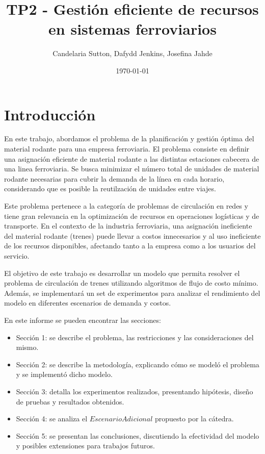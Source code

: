 \documentclass{article}
\title{TP2 - Gestión eficiente de recursos en sistemas ferroviarios}
\author{Candelaria Sutton, Dafydd Jenkins, Josefina Jahde}
\date{\today}
\begin{document}
\maketitle

\section*{Introducción}
En este trabajo, abordamos el problema de la planificación y gestión óptima del material rodante para una empresa ferroviaria. El problema consiste en definir una asignación eficiente de material rodante a las distintas estaciones cabecera de una linea ferroviaria. Se busca minimizar el número total de unidades de material rodante necesarias para cubrir la demanda de la línea en cada horario, considerando que es posible la reutilzación de unidades entre viajes.

Este problema pertenece a la categoría de problemas de circulación en redes y tiene gran relevancia en la optimización de recursos en operaciones logísticas y de transporte. En el contexto de la industria ferroviaria, una asignación ineficiente del material rodante (trenes) puede llevar a costos innecesarios y al uso ineficiente de los recursos disponibles, afectando tanto a la empresa como a los usuarios del servicio.

El objetivo de este trabajo es desarrollar un modelo que permita resolver el problema de circulación de trenes utilizando algoritmos de flujo de costo mínimo. Además, se implementará un set de experimentos para analizar el rendimiento del modelo en diferentes escenarios de demanda y costos.

En este informe se pueden encontrar las secciones:
\begin{itemize}
    \item Sección 1: se describe el problema, las restricciones y las consideraciones del mismo.
    \item Sección 2: se describe la metodología, explicando cómo se modeló el problema y se implementó dicho modelo.
    \item Sección 3: detalla los experimentos realizados, presentando hipótesis, diseño de pruebas y resultados obtenidos.
    \item Sección 4: se analiza el $Escenario Adicional$ propuesto por la cátedra.
    \item Sección 5: se presentan las conclusiones, discutiendo la efectividad del modelo y posibles extensiones para trabajos futuros.
\end{itemize}
\end{document}
